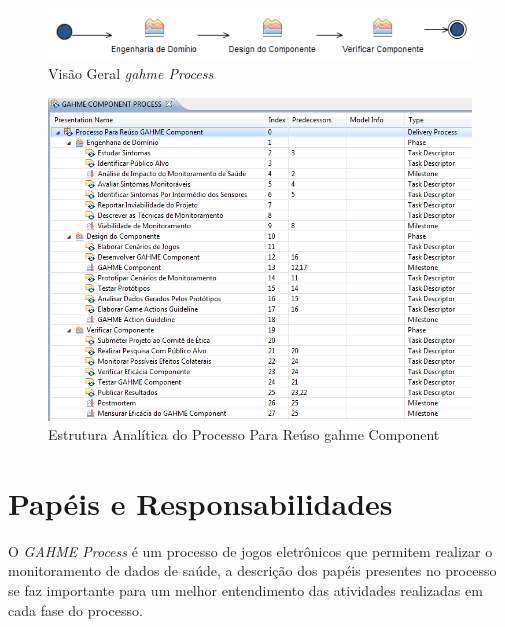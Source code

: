 \begin{figure}
 \centering
 \includegraphics[scale=0.8]{./img/visaogeral.png}
\caption{Visão Geral \textit{\ac{gahme} Process}}
 \label{fig:visaogeral}
\end{figure}

\begin{figure}
 \centering
 \includegraphics[scale=0.8]{./img/wbs2.png}
\caption{Estrutura Analítica do Processo Para Reúso \ac{gahme} Component}
 \label{fig:visaogeral}
\end{figure}

\section{Papéis e Responsabilidades}

O \textit{GAHME Process} é um processo de jogos eletrônicos que permitem realizar o monitoramento de dados de saúde, a descrição dos papéis presentes no processo se faz importante para um melhor entendimento das atividades realizadas em cada fase do processo.

